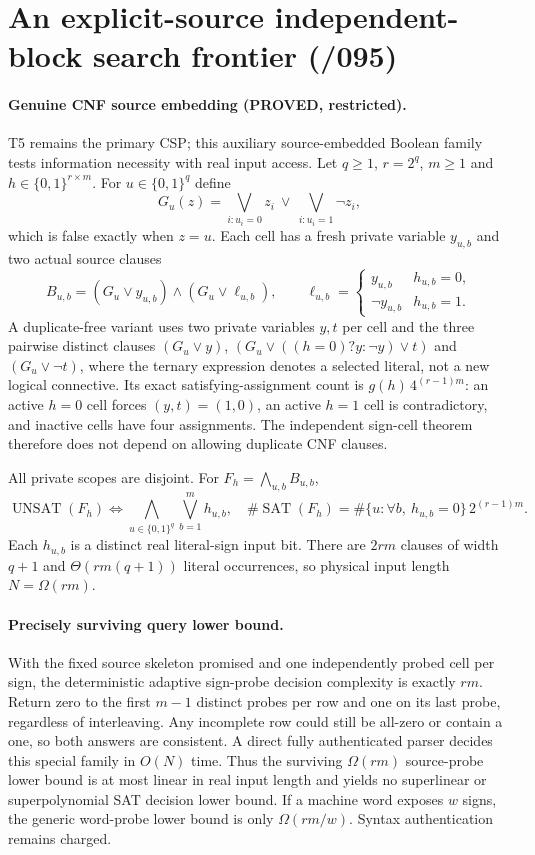 \documentclass[11pt]{article}
\begin{document}
\section{An explicit-source independent-block search frontier (/095)}
\paragraph{Genuine CNF source embedding (PROVED, restricted).}
T5 remains the primary CSP; this auxiliary source-embedded
Boolean family tests information necessity with real input access.
Let $q\ge1$, $r=2^q$, $m\ge1$ and $h\in\{0,1\}^{r\times m}$.
For $u\in\{0,1\}^{q}$ define
\[
G_u(z)=\bigvee_{i:u_i=0}z_i\ \lor\
       \bigvee_{i:u_i=1}\neg z_i,
\]
which is false exactly when $z=u$. Each cell has
a fresh private variable $y_{u,b}$ and two actual
source clauses
\[
B_{u,b}=(G_u\lor y_{u,b})\land
        (G_u\lor\ell_{u,b}),\qquad
\ell_{u,b}=
\begin{cases}y_{u,b}&h_{u,b}=0,\\
\neg y_{u,b}&h_{u,b}=1.\end{cases}
\]
A duplicate-free variant uses two private variables $y,t$
per cell and the three pairwise distinct clauses
$(G_u\lor y)$,
$(G_u\lor((h=0)?y:\neg y)\lor t)$ and
$(G_u\lor\neg t)$, where the ternary expression
denotes a selected literal, not a new logical connective.
Its exact satisfying-assignment count is
$g(h)\,4^{(r-1)m}$: an active $h=0$ cell
forces $(y,t)=(1,0)$, an active $h=1$ cell is
contradictory, and inactive cells have four
assignments. The independent sign-cell theorem
therefore does not depend on allowing duplicate
CNF clauses.

All private scopes are disjoint. For
$F_h=\bigwedge_{u,b}B_{u,b}$,
\[
\operatorname{UNSAT}(F_h)\iff
 \bigwedge_{u\in\{0,1\}^{q}}\bigvee_{b=1}^{m}h_{u,b},
\quad
\#\operatorname{SAT}(F_h)=
 \#\{u:\forall b,\ h_{u,b}=0\}\,2^{(r-1)m}.
\]
Each $h_{u,b}$ is a distinct real literal-sign input
bit. There are $2rm$ clauses of width $q+1$
and $\Theta(rm(q+1))$ literal occurrences,
so physical input length $N=\Omega(rm)$.

\paragraph{Precisely surviving query lower bound.}
With the fixed source skeleton promised and one
independently probed cell per sign, the deterministic
adaptive sign-probe decision complexity is exactly
$rm$. Return zero to the first $m-1$ distinct probes
per row and one on its last probe, regardless of
interleaving. Any incomplete row could still be all-zero
or contain a one, so both answers are consistent.
A direct fully authenticated parser decides this
special family in $O(N)$ time. Thus the surviving
$\Omega(rm)$ source-probe lower bound is at most
linear in real input length and yields no superlinear
or superpolynomial SAT decision lower bound.
If a machine word exposes $w$ signs, the generic
word-probe lower bound is only $\Omega(rm/w)$.
Syntax authentication remains charged.
\end{document}
